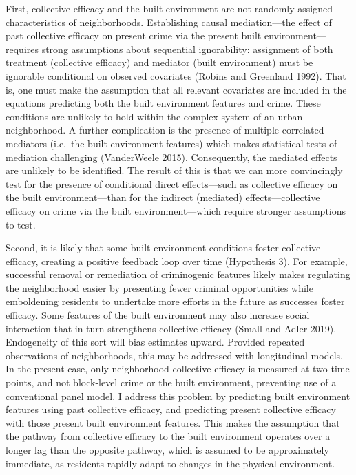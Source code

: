 \documentclass [11pt, proquest] {uwthesis}[2015/03/03]
\begin{document}
First, collective efficacy and the built environment are not randomly assigned characteristics of neighborhoods. Establishing causal mediation---the effect of past collective efficacy on present crime via the present built environment---requires strong assumptions about sequential ignorability: assignment of both treatment (collective efficacy) and mediator (built environment) must be ignorable conditional on observed covariates (Robins and Greenland 1992). That is, one must make the assumption that all relevant covariates are included in the equations predicting both the built environment features and crime. These conditions are unlikely to hold within the complex system of an urban neighborhood. A further complication is the presence of multiple correlated mediators (i.e.~the built environment features) which makes statistical tests of mediation challenging (VanderWeele 2015). Consequently, the mediated effects are unlikely to be identified. The result of this is that we can more convincingly test for the presence of conditional direct effects---such as collective efficacy on the built environment---than for the indirect (mediated) effects---collective efficacy on crime via the built environment---which require stronger assumptions to test.

Second, it is likely that some built environment conditions foster collective efficacy, creating a positive feedback loop over time (Hypothesis 3). For example, successful removal or remediation of criminogenic features likely makes regulating the neighborhood easier by presenting fewer criminal opportunities while emboldening residents to undertake more efforts in the future as successes foster efficacy. Some features of the built environment may also increase social interaction that in turn strengthens collective efficacy (Small and Adler 2019). Endogeneity of this sort will bias estimates upward. Provided repeated observations of neighborhoods, this may be addressed with longitudinal models. In the present case, only neighborhood collective efficacy is measured at two time points, and not block-level crime or the built environment, preventing use of a conventional panel model. I address this problem by predicting built environment features using past collective efficacy, and predicting present collective efficacy with those present built environment features. This makes the assumption that the pathway from collective efficacy to the built environment operates over a longer lag than the opposite pathway, which is assumed to be approximately immediate, as residents rapidly adapt to changes in the physical environment.
\end{document}
